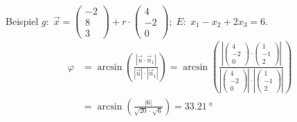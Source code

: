 \documentclass{article}
\begin{document}
\begin{boxx}[DarkBlue]{Beispiel}
        \hspace*{7mm}$\displaystyle g:\; \vec{x} = \begin{pmatrix}-2\\8\\3\end{pmatrix} + r \cdot \begin{pmatrix}4\\-2\\0\end{pmatrix};\; E:\; x_1-x_2+2x_3 = 6$.
        \begin{align*}
            \varphi &= \arcsin\left(\frac{|\vec{u} \cdot \vec{n}_1|}{|\vec{u}|\cdot|\vec{n}_1|}\right)
            = \arcsin\left(\frac{\left|\begin{pmatrix}4\\-2\\0\end{pmatrix}\cdot \begin{pmatrix}1\\-1\\2\end{pmatrix}\right|}{\left|\begin{pmatrix}4\\-2\\0\end{pmatrix}\right|\cdot \left|\begin{pmatrix}1\\-1\\2\end{pmatrix}\right|}\right)\\
            &= \arcsin\left(\frac{|6|}{\sqrt{20}\cdot \sqrt{6}}\right) = \qty{33.21}{\degree}
        \end{align*}
    \end{boxx}
\end{document}

